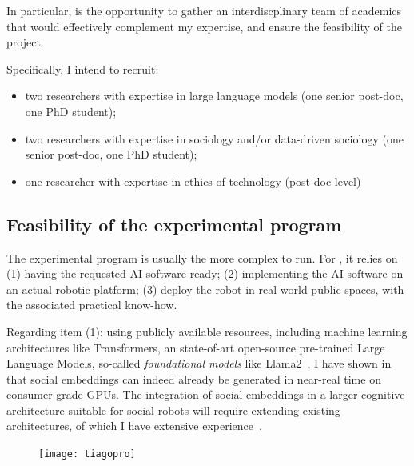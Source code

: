 In particular, \project is the opportunity to gather an interdiscplinary team of
academics that would effectively complement my expertise, and ensure the
feasibility of the project.

Specifically, I intend to recruit:

\begin{itemize}
    \item two researchers with expertise in large language models (one senior
        post-doc, one PhD student);

    \item  two researchers with expertise in sociology and/or data-driven
        sociology (one senior post-doc, one PhD student);

    \item one researcher with expertise in ethics of technology (post-doc level)
\end{itemize}


\subsection{Feasibility of the experimental program}


The experimental program is usually the more complex to run. For \project, it
relies on (1) having the requested AI software ready; (2) implementing the AI
software on an actual robotic platform; (3) deploy the robot in real-world
public spaces, with the associated practical know-how.

Regarding item (1): using publicly available resources, including machine learning architectures
like Transformers, an state-of-art open-source pre-trained Large Language
Models, so-called \emph{foundational models} like
Llama2~\cite{touvron2023llama}, I have shown in~\cite{lemaignan2024social} that
social embeddings can indeed already be generated in near-real time on consumer-grade
GPUs. The integration of social embeddings in a larger cognitive architecture
suitable for social robots will require extending existing architectures, of
which I have extensive experience~\cite{lemaignan2017artificial,
lemaignan2015pyrobots,baxter2016cognitive,lemaignan2014challenges,lemaignan2011what}.

\begin{figure}
    \centering
    \vspace{-10pt}
    \texttt{[image: tiagopro]}
    \label{fig|tiagopro}
\end{figure}

